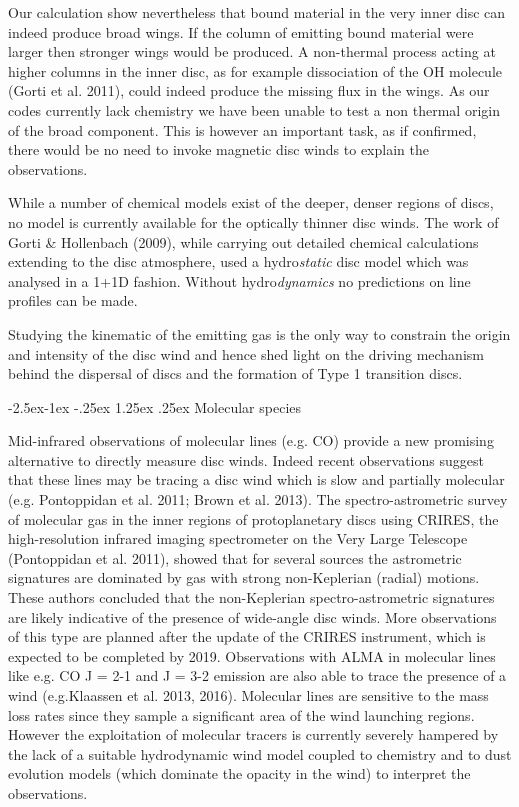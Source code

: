\documentclass[10pt,fleqn,twoside]{article}
\makeatletter
\renewcommand\paragraph{\@startsection{paragraph}{4}{\z@}%
            {-2.5ex\@plus -1ex \@minus -.25ex}%
            {1.25ex \@plus .25ex}%
            {\normalfont\normalsize\bfseries}}
\makeatother
\begin{document}
Our calculation show nevertheless that bound material in the very
inner disc can indeed produce broad wings. If the column of emitting
bound material were larger then stronger wings would be produced. A
non-thermal process acting at higher columns in the inner disc, as for
example dissociation of the OH molecule (Gorti et al. 2011), could
indeed produce the missing flux in the wings. As our codes currently
lack chemistry we have been unable to test a non thermal
origin of the broad component. This is however an important task, as
if confirmed, there would be no need to invoke magnetic disc winds to
explain the observations.  

 While a number of chemical models exist
of the deeper, denser regions of discs, no model is currently
available for the optically thinner disc winds. The work of Gorti \&
Hollenbach (2009), while carrying out detailed chemical calculations
extending to the disc atmosphere, used a hydro{\it static} disc model which
was analysed in a 1+1D fashion. Without hydro{\it dynamics} no predictions
on line profiles can be made.  

Studying the kinematic of the emitting gas is the only way to
constrain the origin and intensity of the disc wind and hence shed
light on the driving mechanism behind the dispersal of discs and the
formation of Type 1 transition discs. 

\paragraph{Molecular species}

Mid-infrared observations of molecular lines (e.g. CO) provide a new
promising alternative to directly measure disc winds. Indeed recent
observations suggest that these lines may be tracing a disc wind which
is slow and partially molecular (e.g. Pontoppidan et al. 2011; Brown et al. 2013). 
The spectro-astrometric survey of molecular gas in the inner regions of
protoplanetary discs using CRIRES, the high-resolution infrared
imaging spectrometer on the Very Large Telescope (Pontoppidan et
al. 2011), showed that for several sources the astrometric signatures
are dominated by gas with strong non-Keplerian (radial) motions. These
authors concluded that the non-Keplerian spectro-astrometric
signatures are likely indicative of the presence of wide-angle disc
winds. 
More observations of this type are planned after the update of
the CRIRES instrument, which is expected to be completed by
2019. Observations with ALMA in molecular lines like e.g. CO J = 2-1
and J = 3-2 emission are also able to trace the presence of a wind (e.g.Klaassen et al. 2013, 2016).  
Molecular lines are sensitive to the mass loss rates since they
sample a significant area of the wind launching regions. However the
exploitation of molecular tracers is currently severely hampered by
the lack of a suitable hydrodynamic wind model coupled to chemistry
and to dust evolution models (which dominate the opacity in the wind)
to interpret the observations.
\end{document}
